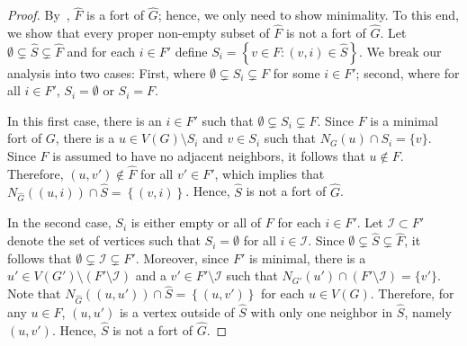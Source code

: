 \documentclass[twoside, 12pt]{article}
\newtheorem{proposition}[theorem]{Proposition}
\theoremstyle{definition}
\newcommand\abs[1]{\left|#1\right|}
\begin{document}
\begin{proof}
    By~\cite[Proposition 4.1]{Cameron2023}, $\hat{F}$ is a fort of $\hat{G}$; hence, we only need to show minimality. 
    To this end, we show that every proper non-empty subset of $\hat{F}$ is not a fort of $\hat{G}$.
    Let $\emptyset\subsetneq\hat{S}\subsetneq\hat{F}$ and for each $i\in F'$ define $S_{i}=\left\{v\in F\colon (v,i)\in\hat{S}\right\}$.
    We break our analysis into two cases: First, where $\emptyset\subsetneq S_{i}\subsetneq F$ for some $i\in F'$; second, where for all $i\in F'$, $S_{i}=\emptyset$ or $S_{i}=F$.

    In this first case, there is an $i\in F'$ such that $\emptyset\subsetneq S_{i}\subsetneq F$.
    Since $F$ is a minimal fort of $G$, there is a $u\in V(G)\setminus{S_{i}}$ and $v\in S_{i}$ such that $N_{G}(u)\cap S_{i} = \{v\}$.
    Since $F$ is assumed to have no adjacent neighbors, it follows that $u\notin F$.
    Therefore, $(u,v')\notin\hat{F}$ for all $v'\in F'$, which implies that $N_{\hat{G}}\left((u,i)\right)\cap\hat{S}=\left\{(v,i)\right\}$.
    Hence, $\hat{S}$ is not a fort of $\hat{G}$. 

    In the second case, $S_{i}$ is either empty or all of $F$ for each $i\in F'$.
    Let $\mathcal{I}\subset F'$ denote the set of vertices such that $S_{i}=\emptyset$ for all $i\in\mathcal{I}$.
    Since $\emptyset\subsetneq\hat{S}\subsetneq\hat{F}$, it follows that $\emptyset\subsetneq\mathcal{I}\subsetneq F'$. 
    Moreover, since $F'$ is minimal, there is a $u'\in V(G')\setminus\left(F'\setminus\mathcal{I}\right)$ and a $v'\in F'\setminus\mathcal{I}$ such that $N_{G'}(u')\cap\left(F'\setminus\mathcal{I}\right)=\{v'\}$. 
    Note that $N_{\hat{G}}\left((u,u')\right)\cap\hat{S}=\left\{(u,v')\right\}$ for each $u\in V(G)$.
    Therefore, for any $u\in F$, $(u,u')$ is a vertex outside of $\hat{S}$ with only one neighbor in $\hat{S}$, namely $(u,v')$.
    Hence, $\hat{S}$ is not a fort of $\hat{G}$. 
\end{proof}

\end{document}
